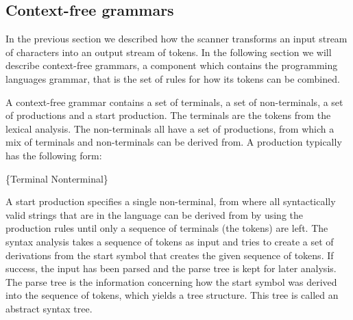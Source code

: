 \subsection{Context-free grammars}
\label{sec:context-freegrammars}
In the previous section we described how the scanner transforms an input stream of
characters into an output stream of tokens. In the following section we
will describe context-free grammars, a component which contains the programming
languages grammar, that is the set of rules for how its tokens can be
combined.

A context-free grammar contains a set of terminals, a set of non-terminals, a
set of productions and a start production. The terminals are the tokens from the
lexical analysis. The non-terminals all have a set of productions, from which a
mix of terminals and non-terminals can be derived from. A production typically
has the following form:

\begin{ebnf}
 {\{Terminal \gor \gcat Nonterminal\}}
\end{ebnf}

A start production specifies a single non-terminal, from where all syntactically
valid strings that are in the language can be derived from by using the
production rules until only a sequence of terminals (the tokens) are left. 
The syntax analysis takes a sequence of tokens as input and tries to create a
set of derivations from the start symbol that creates the given sequence of
tokens. If success, the input has been parsed and the parse tree is kept for
later analysis. The parse tree is the information concerning how the start
symbol was derived into the sequence of tokens, which yields a tree structure.
This tree is called an abstract syntax tree.

